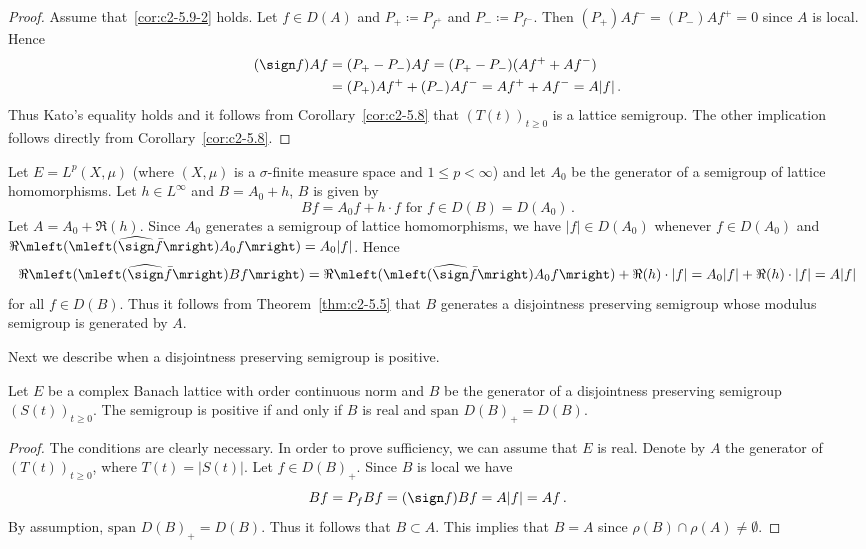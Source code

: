 \begin{proof}
Assume that~\ref{cor:c2-5.9-2}   holds. 
Let $f \in D(A)$ and $P_{+} \coloneqq P_{f^{+}}$ and $P_{-} \coloneqq P_{f^{-}}$.
Then 
$(P_{+})Af^{-} = (P_{-})Af^{+} = 0$ since $A$ is local. 
Hence 
\begin{equation*}
    \begin{split}
    (\sign  f)Af &= (P_{+} - P_{-})Af = (P_{+} - P_{-})(Af^{+} + Af^{-})\\ 
    &= (P_{+})Af^{+} + (P_{-})Af^{-} = Af^{+} + Af^{-} = A|f|\,.
    \end{split}
\end{equation*}
Thus Kato's equality holds and it follows from Corollary~\ref{cor:c2-5.8}   that $(T(t))_{t \geq 0}$ is a lattice semigroup. The other implication follows directly from Corollary~\ref{cor:c2-5.8}.
\end{proof}
\begin{example}\label{ex:c2-5.10}
Let $E = L^{p}(X,\mu)$ (where $(X,\mu)$ is a $\sigma$-finite measure space and $1 \leq p < \infty$) and let $A_{0}$ be the generator of a semigroup of lattice homomorphisms. 
Let $h \in L^{\infty}$ and $B = A_{0} + h$, \ie $B$ is given by 
\[
Bf = A_{0}f + h \cdot f  \text{ for } f \in D(B) = D(A_{0})\,. 
\]
Let $A = A_{0} + \Re(h)$.
Since $A_{0}$ generates a semigroup of lattice homomorphisms, we have $|f| \in D(A_{0})$ whenever $f \in D(A_{0})$ and $\Re\mleft(\mleft( \widehat{\sign} \bar{f}\mright)A_{0}f\mright) = A_{0}|f|$.
Hence 
\[\Re\mleft(\mleft(\widehat{\sign}  \bar{f}\mright)Bf\mright) = \Re\mleft(\mleft(\widehat{\sign}  \bar{f}\mright)A_{0}f\mright) + \Re(h) \cdot |f| = A_{0}|f| + \Re(h) \cdot |f| = A|f|
\]
for all $f \in D(B)$. 
Thus it follows from Theorem~\ref{thm:c2-5.5}   that $B$ generates a disjointness preserving semigroup whose modulus semigroup is generated by $A$.
\end{example}
Next we describe when a disjointness preserving semigroup is positive.
\begin{proposition}\label{prop:c2-5.11}
%
Let $E$ be a complex Banach lattice with order continuous norm and $B$ be the generator of a disjointness preserving semigroup $(S(t))_{t \geq 0}$. 
The semigroup is positive if and only if\/ $B$ is real and $\text{span } D(B)_{+} = D(B)$.
\end{proposition}
\begin{proof}
The conditions are clearly necessary. 
In order to prove sufficiency, we can assume that $E$ is real. 
Denote by $A$ the generator of\/ $(T(t))_{t \geq 0}$, where $T(t) = |S(t)|$. 
Let $f \in D(B)_{+}$. 
Since $B$ is local we have 
\[
Bf = P_{f}Bf = (\sign  f)Bf = A|f| = Af\,.
\]
By assumption, $\text{span } D(B)_{+} = D(B)$. 
Thus it follows that $B \subset A$. 
This implies that $B = A$ since $\rho(B) \cap \rho(A) \neq \emptyset$.
\end{proof}
